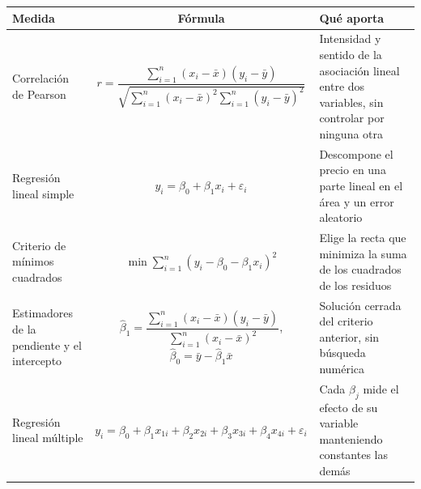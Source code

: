         \begin{strip}
            \centering
            \label{measures}
            \begin{center}
                \footnotesize
                \setlength{\tabcolsep}{4pt}
                \begin{tabular}{|>{\raggedright\arraybackslash}p{3.3cm}|c|
                                >{\raggedright\arraybackslash}p{5.2cm}|}
                    \hline
                    \textbf{Medida} & \textbf{Fórmula} & \textbf{Qué aporta} \\
                    \hline
                    Correlación de Pearson &
                    $r = \dfrac{\sum_{i=1}^{n} (x_{i} - \bar{x})(y_{i} - \bar{y})}
                    {\sqrt{\sum_{i=1}^{n} (x_{i} - \bar{x})^{2}
                    \sum_{i=1}^{n} (y_{i} - \bar{y})^{2}}}$ &
                    Intensidad y sentido de la asociación lineal entre dos
                    variables, sin controlar por ninguna otra \\
                    \hline
                    Regresión lineal simple &
                    $y_{i} = \beta_{0} + \beta_{1} x_{i} + \varepsilon_{i}$ &
                    Descompone el precio en una parte lineal en el área y un error
                    aleatorio \\
                    \hline
                    Criterio de mínimos cuadrados &
                    $\displaystyle\min \sum_{i=1}^{n}
                    (y_{i} - \beta_{0} - \beta_{1} x_{i})^{2}$ &
                    Elige la recta que minimiza la suma de los cuadrados de los
                    residuos \\
                    \hline
                    Estimadores de la pendiente y el intercepto &
                    $\hat{\beta}_{1} = \dfrac{\sum_{i=1}^{n}
                    (x_{i} - \bar{x})(y_{i} - \bar{y})}
                    {\sum_{i=1}^{n} (x_{i} - \bar{x})^{2}}$, \quad
                    $\hat{\beta}_{0} = \bar{y} - \hat{\beta}_{1} \bar{x}$ &
                    Solución cerrada del criterio anterior, sin búsqueda numérica \\
                    \hline
                    Regresión lineal múltiple &
                    $y_{i} = \beta_{0} + \beta_{1} x_{1i} + \beta_{2} x_{2i} +
                    \beta_{3} x_{3i} + \beta_{4} x_{4i} + \varepsilon_{i}$ &
                    Cada $\beta_{j}$ mide el efecto de su variable manteniendo
                    constantes las demás \\

\end{tabular}
\end{center}
\end{strip}

